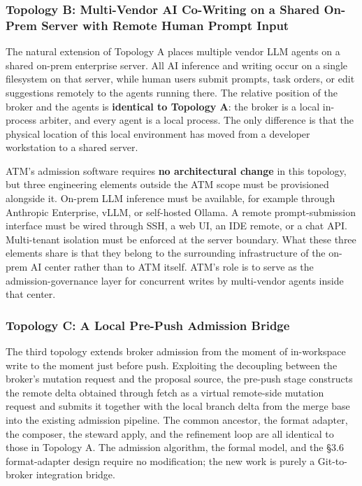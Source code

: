 \documentclass[9pt,letterpaper]{extarticle}
\begin{document}
\subsubsection*{Topology B: Multi-Vendor AI Co-Writing on a Shared On-Prem Server with Remote Human Prompt Input}

The natural extension of Topology A places multiple vendor LLM agents on a shared on-prem enterprise server. All AI inference and writing occur on a single filesystem on that server, while human users submit prompts, task orders, or edit suggestions remotely to the agents running there. The relative position of the broker and the agents is \textbf{identical to Topology A}: the broker is a local in-process arbiter, and every agent is a local process. The only difference is that the physical location of this {}local{} environment has moved from a developer workstation to a shared server.

ATM's admission software requires \textbf{no architectural change} in this topology, but three engineering elements outside the ATM scope must be provisioned alongside it. On-prem LLM inference must be available, for example through Anthropic Enterprise, vLLM, or self-hosted Ollama. A remote prompt-submission interface must be wired through SSH, a web UI, an IDE remote, or a chat API. Multi-tenant isolation must be enforced at the server boundary. What these three elements share is that they belong to the surrounding infrastructure of the on-prem AI center rather than to ATM itself. ATM's role is to serve as the admission-governance layer for concurrent writes by multi-vendor agents inside that center.

\subsubsection*{Topology C: A Local Pre-Push Admission Bridge}

The third topology extends broker admission from the moment of in-workspace write to the moment just before push. Exploiting the decoupling between the broker's mutation request and the proposal source, the pre-push stage constructs the remote delta obtained through fetch as a virtual remote-side mutation request and submits it together with the local branch delta from the merge base into the existing admission pipeline. The common ancestor, the format adapter, the composer, the steward apply, and the refinement loop are all identical to those in Topology A. The admission algorithm, the formal model, and the §3.6 format-adapter design require no modification; the new work is purely a Git-to-broker integration bridge.
\end{document}
